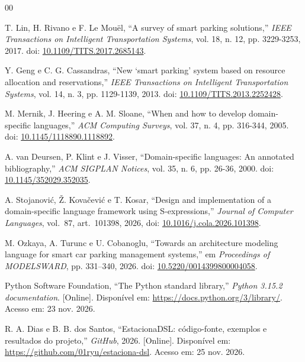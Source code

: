 \documentclass[conference,a4paper]{IEEEtran}
\begin{document}
\begin{thebibliography}{00}

T. Lin, H. Rivano e F. Le Mouël, ``A survey of smart parking solutions,'' \emph{IEEE Transactions on Intelligent Transportation Systems}, vol. 18, n. 12, pp. 3229-3253, 2017. doi: \href{https://doi.org/10.1109/TITS.2017.2685143}{10.1109/TITS.2017.2685143}.

Y. Geng e C. G. Cassandras, ``New `smart parking' system based on resource allocation and reservations,'' \emph{IEEE Transactions on Intelligent Transportation Systems}, vol. 14, n. 3, pp. 1129-1139, 2013. doi: \href{https://doi.org/10.1109/TITS.2013.2252428}{10.1109/TITS.2013.2252428}.

M. Mernik, J. Heering e A. M. Sloane, ``When and how to develop domain-specific languages,'' \emph{ACM Computing Surveys}, vol. 37, n. 4, pp. 316-344, 2005. doi: \href{https://doi.org/10.1145/1118890.1118892}{10.1145/1118890.1118892}.

A. van Deursen, P. Klint e J. Visser, ``Domain-specific languages: An annotated bibliography,'' \emph{ACM SIGPLAN Notices}, vol. 35, n. 6, pp. 26-36, 2000. doi: \href{https://doi.org/10.1145/352029.352035}{10.1145/352029.352035}.

A. Stojanovi\'{c}, \v{Z}. Kova\v{c}evi\'{c} e T. Kosar, ``Design and implementation of a domain-specific language framework using S-expressions,'' \emph{Journal of Computer Languages}, vol.~87, art.~101398, 2026, doi: \href{https://doi.org/10.1016/j.cola.2026.101398}{10.1016/j.cola.2026.101398}.

M. Ozkaya, A. Turunc e U. Cobanoglu, ``Towards an architecture modeling language for smart car parking management systems,'' em \emph{Proceedings of MODELSWARD}, pp. 331--340, 2026. doi: \href{https://doi.org/10.5220/0014399800004058}{10.5220/0014399800004058}.

Python Software Foundation, ``The Python standard library,'' \emph{Python 3.15.2 documentation}. [Online]. Disponível em: \href{https://docs.python.org/3/library/}{https://docs.python.org/3/library/}. Acesso em: 23 nov. 2026.


R. A. Dias e B. B. dos Santos, ``EstacionaDSL: código-fonte, exemplos e resultados do projeto,'' \emph{GitHub}, 2026. [Online]. Disponível em: \url{https://github.com/01ryu/estaciona-dsl}. Acesso em: 25 nov. 2026.

\end{thebibliography}
\end{document}
